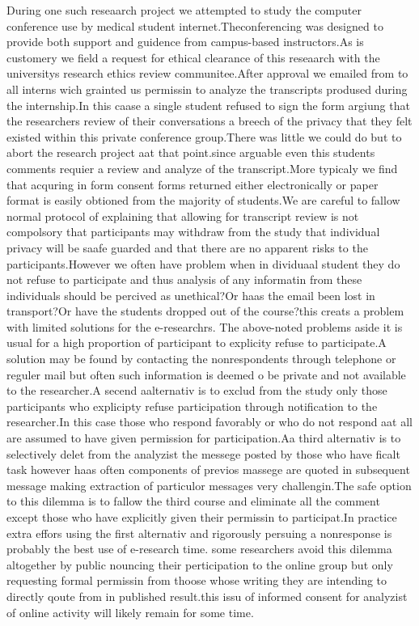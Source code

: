 \documentclass[a4paper]{book}
\begin{document}
During one such reseaarch project we attempted to study the computer conference use by medical student internet.Theconferencing was designed to provide both support and guidence from campus-based instructors.As is customery we field a request for ethical clearance of this reseaarch with the universitys research ethics review communitee.After approval we emailed from to all interns wich grainted us permissin to analyze the transcripts prodused during the internship.In this caase a single student refused to sign the form argiung that the researchers review of their conversations a breech of the privacy that they felt existed within this private conference group.There was little we could do but to abort the research project aat that point.since arguable even this students comments requier a review and analyze of the transcript.More typicaly we find that acquring in form consent forms returned either electronically or paper format is easily obtioned from the majority of students.We are careful to fallow normal protocol of explaining that allowing for transcript review is not compolsory that participants may withdraw from the study that individual privacy will be saafe guarded and that there are no apparent risks to the participants.However we often have problem when in dividuaal student they do not refuse to participate and thus analysis of any informatin from these individuals should be percived as unethical?Or haas the email been lost in transport?Or have the students dropped out of the course?this creats a problem with limited solutions for the e-researchrs.
The above-noted problems aside it is usual for a high proportion of participant to explicity refuse to participate.A solution may be found by contacting the nonrespondents through telephone or reguler mail but often such information is deemed o be private and not available to the researcher.A secend aalternativ is to exclud from 
\newpage
the study only those participants who explicipty refuse participation through notification to the researcher.In this case those who respond favorably or who do not respond aat all are assumed to have given permission for participation.Aa third alternativ is to selectively delet from the analyzist the messege posted by those who have ficalt task however haas often components of previos massege are quoted in subsequent message making extraction of particulor messages very challengin.The safe option to this dilemma is to fallow the third course and eliminate all the comment except those who have explicitly given their permissin to participat.In practice extra effors using the first alternativ and rigorously persuing a nonresponse is probably the best use of e-research time. some researchers avoid this dilemma altogether by public nouncing their perticipation to the online group but only requesting formal permissin from thoose whose writing they are intending to directly qoute from in published result.this issu of informed consent for analyzist of online activity will likely remain for some time.
\end{document}
